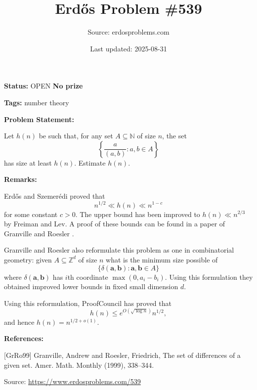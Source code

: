 \documentclass{article}
\title{Erd\H{o}s Problem \#539}
\date{Last updated: 2025-08-31}
\author{Source: erdosproblems.com}
\begin{document}
\maketitle

\noindent\textbf{Status:} OPEN \quad \textbf{No prize}

\noindent\textbf{Tags:} number theory

\medskip
\noindent\textbf{Problem Statement:}

Let $h(n)$ be such that, for any set $A\subseteq \mathbb{N}$ of size $n$, the set\[\left\{ \frac{a}{(a,b)}: a,b\in A\right\}\]has size at least $h(n)$. Estimate $h(n)$.

\bigskip
\noindent\textbf{Remarks:}

Erd\H{o}s and Szemer\'{e}di proved that\[n^{1/2} \ll h(n) \ll n^{1-c}\]for some constant $c>0$. The upper bound has been improved to $h(n)\ll n^{2/3}$ by Freiman and Lev. A proof of these bounds can be found in a paper of Granville and Roesler \cite{GrRo99}.

Granville and Roesler also reformulate this problem as one in combinatorial geometry: given $A\subseteq \mathbb{Z}^d$ of size $n$ what is the minimum size possible of\[\{ \delta(\mathbf{a},\mathbf{b}) : \mathbf{a},\mathbf{b}\in A\}\]where $\delta(\mathbf{a},\mathbf{b})$ has $i$th coordinate $\max(0,a_i-b_i)$. Using this formulation they obtained improved lower bounds in fixed small dimension $d$.

Using this reformulation, ProofCouncil has proved that\[h(n) \leq e^{O(\sqrt{\log n})} n^{1/2},\]and hence $h(n)=n^{1/2+o(1)}$.

\bigskip
\noindent\textbf{References:}

[GrRo99] Granville, Andrew and Roesler, Friedrich, The set of differences of a given set. Amer. Math. Monthly (1999), 338--344.

\bigskip
\noindent\small{Source: \url{https://www.erdosproblems.com/539}}
\end{document}
